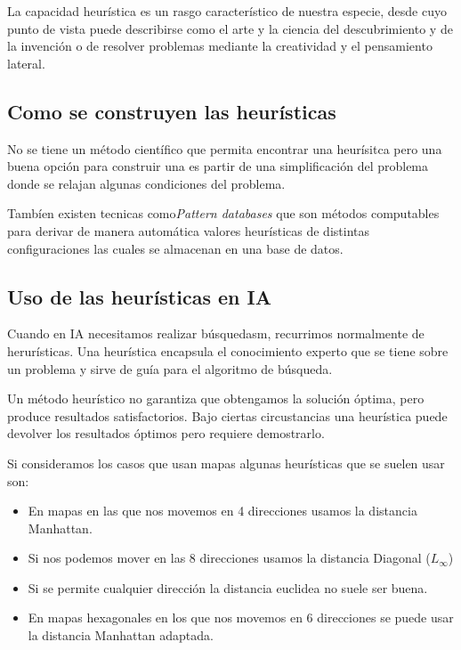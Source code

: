 \documentclass[12pt]{article}
\begin{document}
La capacidad heurística es un rasgo característico de nuestra especie,
desde cuyo punto de vista puede describirse como el arte y la ciencia
del descubrimiento y de la invención o de resolver problemas mediante
la creatividad y el pensamiento lateral.

\subsection{Como se construyen las heurísticas}

No se tiene un método científico que permita encontrar
una heurísitca pero una buena opción para construir una es partir de
una simplificación del problema donde se relajan algunas condiciones
del problema.

Tambíen existen tecnicas como\textit{Pattern databases} que son
métodos computables para derivar de manera automática valores
heurísticas de distintas configuraciones las cuales se almacenan en
una base de datos.

\subsection{Uso de las heurísticas en IA}

Cuando en IA necesitamos realizar búsquedasm, recurrimos normalmente
de herurísticas. Una heurística encapsula el conocimiento experto que
se tiene sobre un problema y sirve de guía para el algoritmo de
búsqueda.

Un método heurístico no garantiza que obtengamos la solución óptima,
pero produce resultados satisfactorios. Bajo ciertas circustancias una
heurística puede devolver los resultados óptimos pero requiere
demostrarlo.

Si consideramos los casos que usan mapas algunas heurísticas que se
suelen usar son:

\begin{itemize}
\item En mapas en las que nos movemos en 4 direcciones usamos la
  distancia Manhattan.
\item Si nos podemos mover en las 8 direcciones usamos la distancia Diagonal ($L_\infty$)
\item Si se permite cualquier dirección la distancia euclidea no suele ser buena.
\item En mapas hexagonales en los que nos movemos en 6 direcciones se
  puede usar la distancia Manhattan adaptada.
\end{itemize}
\end{document}
